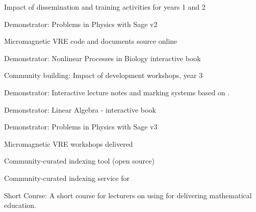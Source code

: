 \begin{workpackage}
\begin{wpdelivs}
  \begin{wpdeliv}[due=24,id=dissem-1,dissem=PU,nature=R,lead=PS]{Impact of dissemination and training activities for years 1 and 2}\end{wpdeliv}
   \begin{wpdeliv}[due=30,id=ibook3b,dissem=PU,nature=DEM,lead=US]{Demonstrator: Problems in Physics with Sage v2} \end{wpdeliv}
   \begin{wpdeliv}[due=32,id=oommfnb-source-and-testing-setup,dissem=PU,nature=DEC,lead=USO]{Micromagnetic
     VRE code and documents source online} \end{wpdeliv}
 \begin{wpdeliv}[due=36,id=ibook1,dissem=PU,nature=DEM,lead=US]{Demonstrator: Nonlinear Processes in Biology  interactive book} \end{wpdeliv}
 \begin{wpdeliv}[due=36,id=workshops-3,dissem=PU,nature=R,lead=PS]{Community building: Impact of development workshops, year 3}\end{wpdeliv}
  \begin{wpdeliv}[due=36,id=lecture-notes,dissem=PU,nature=DEM,lead=USH]{Demonstrator: Interactive lecture notes and marking systems based on \TheProject.}\end{wpdeliv}
 \begin{wpdeliv}[due=30,id=ibook2,dissem=PU,nature=DEM,lead=US]{Demonstrator: Linear Algebra -  interactive book} \end{wpdeliv}
 \begin{wpdeliv}[due=44,id=ibook3c,dissem=PU,nature=DEM,lead=US]{Demonstrator: Problems in Physics with Sage v3} \end{wpdeliv}
 \begin{wpdeliv}[due=44,id=oommfnb-workshops,dissem=PU,nature=OTHER,lead=USO]{Micromagnetic
     VRE workshops delivered} \end{wpdeliv}
 \begin{wpdeliv}[due=24,id=ils-tool,dissem=PU,nature=P,lead=UV]{Community-curated
     indexing tool (open source)} \end{wpdeliv}
 \begin{wpdeliv}[due=24,id=ils-service,dissem=PU,nature=DEM,lead=UV]{Community-curated
     indexing service for \TheProject} \end{wpdeliv}
 \begin{wpdeliv}[due=18,id=short-course,dissem=PU,nature=DEC,lead=USH]{Short Course: A short course for lecturers on using \TheProject for delivering mathematical education.}\end{wpdeliv}

\end{wpdelivs}
\end{workpackage}
